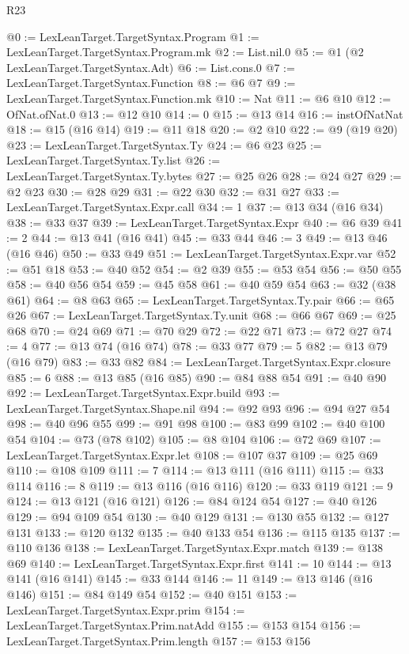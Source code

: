 \begin{lexlean}{R23}
\begin{coremodule}
@0 := LexLeanTarget.TargetSyntax.Program
@1 := LexLeanTarget.TargetSyntax.Program.mk
@2 := List.nil.{0}
@5 := @1 (@2 LexLeanTarget.TargetSyntax.Adt)
@6 := List.cons.{0}
@7 := LexLeanTarget.TargetSyntax.Function
@8 := @6 @7
@9 := LexLeanTarget.TargetSyntax.Function.mk
@10 := Nat
@11 := @6 @10
@12 := OfNat.ofNat.{0}
@13 := @12 @10
@14 := 0
@15 := @13 @14
@16 := instOfNatNat
@18 := @15 (@16 @14)
@19 := @11 @18
@20 := @2 @10
@22 := @9 (@19 @20)
@23 := LexLeanTarget.TargetSyntax.Ty
@24 := @6 @23
@25 := LexLeanTarget.TargetSyntax.Ty.list
@26 := LexLeanTarget.TargetSyntax.Ty.bytes
@27 := @25 @26
@28 := @24 @27
@29 := @2 @23
@30 := @28 @29
@31 := @22 @30
@32 := @31 @27
@33 := LexLeanTarget.TargetSyntax.Expr.call
@34 := 1
@37 := @13 @34 (@16 @34)
@38 := @33 @37
@39 := LexLeanTarget.TargetSyntax.Expr
@40 := @6 @39
@41 := 2
@44 := @13 @41 (@16 @41)
@45 := @33 @44
@46 := 3
@49 := @13 @46 (@16 @46)
@50 := @33 @49
@51 := LexLeanTarget.TargetSyntax.Expr.var
@52 := @51 @18
@53 := @40 @52
@54 := @2 @39
@55 := @53 @54
@56 := @50 @55
@58 := @40 @56 @54
@59 := @45 @58
@61 := @40 @59 @54
@63 := @32 (@38 @61)
@64 := @8 @63
@65 := LexLeanTarget.TargetSyntax.Ty.pair
@66 := @65 @26
@67 := LexLeanTarget.TargetSyntax.Ty.unit
@68 := @66 @67
@69 := @25 @68
@70 := @24 @69
@71 := @70 @29
@72 := @22 @71
@73 := @72 @27
@74 := 4
@77 := @13 @74 (@16 @74)
@78 := @33 @77
@79 := 5
@82 := @13 @79 (@16 @79)
@83 := @33 @82
@84 := LexLeanTarget.TargetSyntax.Expr.closure
@85 := 6
@88 := @13 @85 (@16 @85)
@90 := @84 @88 @54
@91 := @40 @90
@92 := LexLeanTarget.TargetSyntax.Expr.build
@93 := LexLeanTarget.TargetSyntax.Shape.nil
@94 := @92 @93
@96 := @94 @27 @54
@98 := @40 @96 @55
@99 := @91 @98
@100 := @83 @99
@102 := @40 @100 @54
@104 := @73 (@78 @102)
@105 := @8 @104
@106 := @72 @69
@107 := LexLeanTarget.TargetSyntax.Expr.let
@108 := @107 @37
@109 := @25 @69
@110 := @108 @109
@111 := 7
@114 := @13 @111 (@16 @111)
@115 := @33 @114
@116 := 8
@119 := @13 @116 (@16 @116)
@120 := @33 @119
@121 := 9
@124 := @13 @121 (@16 @121)
@126 := @84 @124 @54
@127 := @40 @126
@129 := @94 @109 @54
@130 := @40 @129
@131 := @130 @55
@132 := @127 @131
@133 := @120 @132
@135 := @40 @133 @54
@136 := @115 @135
@137 := @110 @136
@138 := LexLeanTarget.TargetSyntax.Expr.match
@139 := @138 @69
@140 := LexLeanTarget.TargetSyntax.Expr.first
@141 := 10
@144 := @13 @141 (@16 @141)
@145 := @33 @144
@146 := 11
@149 := @13 @146 (@16 @146)
@151 := @84 @149 @54
@152 := @40 @151
@153 := LexLeanTarget.TargetSyntax.Expr.prim
@154 := LexLeanTarget.TargetSyntax.Prim.natAdd
@155 := @153 @154
@156 := LexLeanTarget.TargetSyntax.Prim.length
@157 := @153 @156

\end{coremodule}
\end{lexlean}
